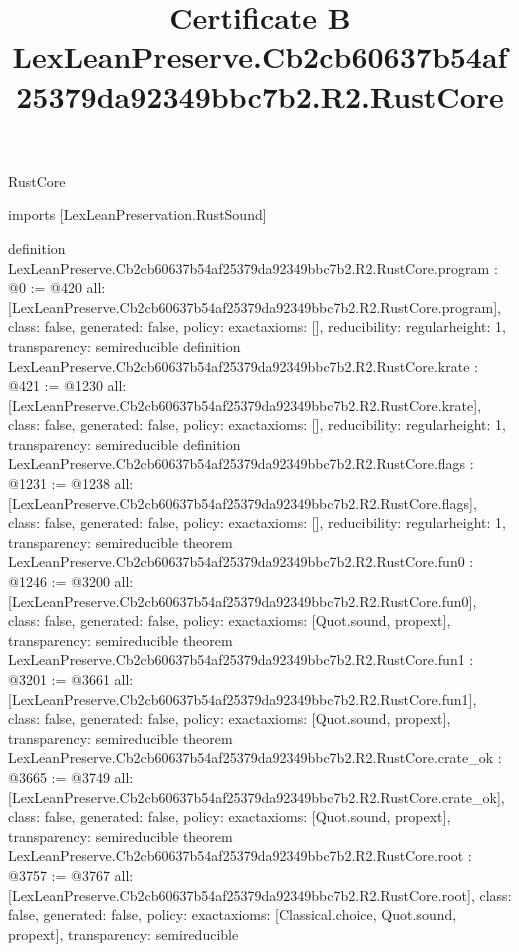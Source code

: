 \begin{lexlean}{RustCore}
\title{Certificate B LexLeanPreserve.Cb2cb60637b54af25379da92349bbc7b2.R2.RustCore}
\begin{coremodule}
imports [LexLeanPreservation.RustSound]

definition LexLeanPreserve.Cb2cb60637b54af25379da92349bbc7b2.R2.RustCore.program : @0 := @420 {
  all: [LexLeanPreserve.Cb2cb60637b54af25379da92349bbc7b2.R2.RustCore.program],
  class: false,
  generated: false,
  policy: exact{axioms: []},
  reducibility: regular{height: 1},
  transparency: semireducible
}
definition LexLeanPreserve.Cb2cb60637b54af25379da92349bbc7b2.R2.RustCore.krate : @421 := @1230 {
  all: [LexLeanPreserve.Cb2cb60637b54af25379da92349bbc7b2.R2.RustCore.krate],
  class: false,
  generated: false,
  policy: exact{axioms: []},
  reducibility: regular{height: 1},
  transparency: semireducible
}
definition LexLeanPreserve.Cb2cb60637b54af25379da92349bbc7b2.R2.RustCore.flags : @1231 := @1238 {
  all: [LexLeanPreserve.Cb2cb60637b54af25379da92349bbc7b2.R2.RustCore.flags],
  class: false,
  generated: false,
  policy: exact{axioms: []},
  reducibility: regular{height: 1},
  transparency: semireducible
}
theorem LexLeanPreserve.Cb2cb60637b54af25379da92349bbc7b2.R2.RustCore.fun0 : @1246 := @3200 {
  all: [LexLeanPreserve.Cb2cb60637b54af25379da92349bbc7b2.R2.RustCore.fun0],
  class: false,
  generated: false,
  policy: exact{axioms: [Quot.sound, propext]},
  transparency: semireducible
}
theorem LexLeanPreserve.Cb2cb60637b54af25379da92349bbc7b2.R2.RustCore.fun1 : @3201 := @3661 {
  all: [LexLeanPreserve.Cb2cb60637b54af25379da92349bbc7b2.R2.RustCore.fun1],
  class: false,
  generated: false,
  policy: exact{axioms: [Quot.sound, propext]},
  transparency: semireducible
}
theorem LexLeanPreserve.Cb2cb60637b54af25379da92349bbc7b2.R2.RustCore.crate_ok : @3665 := @3749 {
  all: [LexLeanPreserve.Cb2cb60637b54af25379da92349bbc7b2.R2.RustCore.crate_ok],
  class: false,
  generated: false,
  policy: exact{axioms: [Quot.sound, propext]},
  transparency: semireducible
}
theorem LexLeanPreserve.Cb2cb60637b54af25379da92349bbc7b2.R2.RustCore.root : @3757 := @3767 {
  all: [LexLeanPreserve.Cb2cb60637b54af25379da92349bbc7b2.R2.RustCore.root],
  class: false,
  generated: false,
  policy: exact{axioms: [Classical.choice, Quot.sound, propext]},
  transparency: semireducible
}


\end{coremodule}
\end{lexlean}
